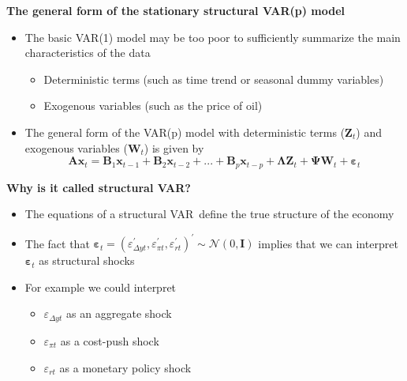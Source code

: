 \documentclass[10pt,handout]{beamer}
\begin{document}
\vspace{0.1cm}

\begin{frame}
{\textbf{The general form of the stationary structural VAR(p) model}}

\begin{itemize}
\item The basic VAR(1) model may be too poor to sufficiently summarize the
main characteristics of the data\medskip \pause

\begin{itemize}
\item Deterministic terms (such as time trend or seasonal dummy variables)

\item Exogenous variables (such as the price of oil)\medskip \pause
\end{itemize}

\item The general form of the VAR(p) model with deterministic terms ($%
\mathbf{Z}_{t}$) and exogenous variables ($\mathbf{W}_{t}$) is given by%
\begin{equation*}
\mathbf{Ax}_{t}=\mathbf{B}_{1}\mathbf{x}_{t-1}+\mathbf{B}_{2}\mathbf{x}%
_{t-2}+...+\mathbf{B}_{p}\mathbf{x}_{t-p}+\boldsymbol{\Lambda }\mathbf{Z}%
_{t}+\boldsymbol{\Psi }\mathbf{W}_{t}+\mathbf{\varepsilon }_{t}
\end{equation*}
\end{itemize}
\end{frame}

\vspace{0.1cm}

\begin{frame}
{\textbf{Why is it called structural VAR?}}

\begin{itemize}
\item The equations of a structural VAR\ define the {{\color{red} true
structure of the economy}}\medskip \pause

\item The fact that $\mathbf{\varepsilon }_{t}=(\varepsilon _{\Delta
yt}^{\prime },\varepsilon _{\pi t}^{\prime },\varepsilon _{rt}^{\prime
})^{\prime }\sim \mathcal{N}(0,\mathbf{I})$ implies that we can interpret $%
\mathbf{\varepsilon }_{t}$ as structural shocks \medskip \pause

\item For example we could interpret

\begin{itemize}
\item $\varepsilon _{\Delta yt}$ as an {aggregate shock}

\item $\varepsilon _{\pi t}$ as a {cost-push shock}

\item $\varepsilon _{rt}$ as a {monetary policy shock}
\end{itemize}
\end{itemize}
\end{frame}
\end{document}
